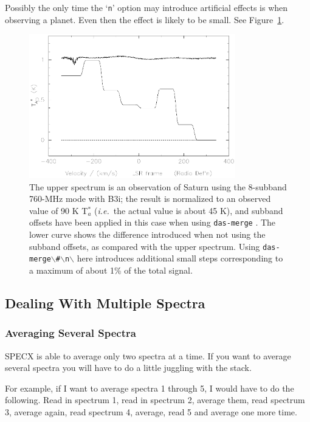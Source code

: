 \documentclass[11pt,twoside]{starlink}
\providecommand{\ie}{\textit{i.e.}}
\providecommand{\dm}{\texttt{das-merge}}
\begin{document}
Possibly the only time the `\texttt{n}' option may introduce artificial
effects is when observing a planet.  Even then the effect is likely to
be small. See Figure~\ref{fig:merge_diffs}.
%
\begin{figure}[ht]
\centering
\includegraphics[width=0.8\textwidth]{sc8_merge_diffs}
\caption[\dm\ and planets]
{\small{The upper spectrum is an observation of Saturn using the
8-subband 760-MHz mode with B3i; the result is normalized to an
observed value of 90 K T$^*_a$ (\ie\ the actual value is about 45 K),
and subband offsets have been applied in this case when using \dm
. The lower curve shows the difference introduced when not using the
subband offsets, as compared with the upper spectrum. Using \texttt{das-merge$\backslash$\#$\backslash$n$\backslash$} here introduces
additional small steps corresponding to a maximum of about 1\% of the
total signal.}}
\label{fig:merge_diffs}
\end{figure}
%



\subsection{Dealing With Multiple Spectra}
\label{sec:specx_8}
\subsubsection{Averaging Several Spectra}
\label{sec:specx_8.2}

SPECX is able to average only two spectra at a time.  If you want to
average several spectra you will have to do a little juggling with the
stack.

For example, if I want to average spectra 1 through 5, I would have
to do the following.  Read in spectrum 1, read in spectrum 2, average
them, read spectrum 3, average again, read spectrum 4, average, read 5
and average one more time.
\end{document}
